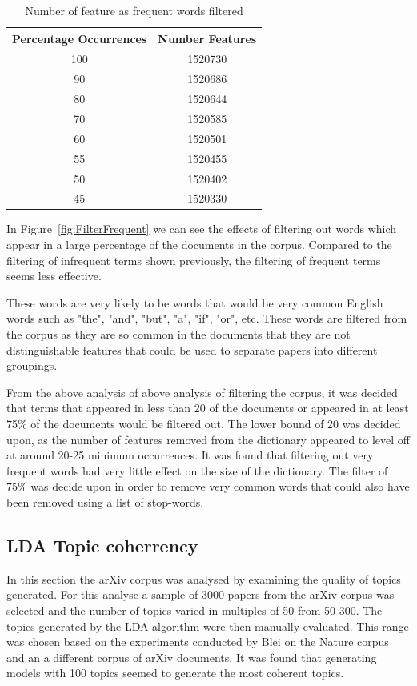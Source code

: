 \begin{table}[h]
    \centering
    \begin{tabular}{|c c|}
         \hline
         Percentage Occurrences & Number Features \\ [0.5ex]
         \hline\hline
         100 & 1520730 \\
         90 & 1520686 \\
         80 & 1520644 \\
         70 & 1520585 \\
         60 & 1520501 \\
         55 & 1520455 \\
         50 & 1520402 \\
         45 & 1520330 \\ [1ex]
         \hline
    \end{tabular}
    \caption{Number of feature as frequent words filtered}
    \label{table:frequentFeatures}
\end{table}

In Figure~\ref{fig:FilterFrequent} we can see the effects of filtering out words which appear in a large percentage of the documents in the corpus.
Compared to the filtering of infrequent terms shown previously, the filtering of frequent terms seems less effective.

These words are very likely to be words that would be very common English words such as "the", "and", "but", "a", "if", "or", etc.
These words are filtered from the corpus as they are so common in the documents that they are not distinguishable features that could be used to separate papers into different groupings.

From the above analysis of above analysis of filtering the corpus, it was decided that terms that appeared in less than 20 of the documents or appeared in at least 75\% of the documents would be filtered out.
The lower bound of 20 was decided upon, as the number of features removed from the dictionary appeared to level off at around 20-25 minimum occurrences.
It was found that filtering out very frequent words had very little effect on the size of the dictionary.
The filter of 75\% was decide upon in order to remove very common words that could also have been removed using a list of stop-words.

\subsection{LDA Topic coherrency}
In this section the arXiv corpus was analysed by examining the quality of topics generated.
For this analyse a sample of 3000 papers from the arXiv corpus was selected and the number of topics varied in multiples of 50 from 50-300.
The topics generated by the LDA algorithm were then manually evaluated.
This range was chosen based on the experiments conducted by Blei on the Nature corpus and an a different corpus of arXiv documents.
It was found that generating models with 100 topics seemed to generate the most coherent topics.

